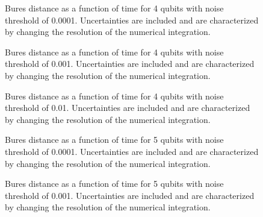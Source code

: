 \pagebreak

\begin{figure}[h]
\begin{center}
\end{center}
\caption{Bures distance as a function of time for 4 qubits with noise
threshold of 0.0001.  Uncertainties are included and are characterized 
by changing the resolution of the numerical integration.}
\end{figure}

\pagebreak

\begin{figure}[h]
\begin{center}
\end{center}
\caption{Bures distance as a function of time for 4 qubits with noise
threshold of 0.001.  Uncertainties are included and are characterized 
by changing the resolution of the numerical integration.}
\end{figure}

\pagebreak

\begin{figure}[h]
\begin{center}
\end{center}
\caption{Bures distance as a function of time for 4 qubits with noise
threshold of 0.01.  Uncertainties are included and are characterized 
by changing the resolution of the numerical integration.}
\end{figure}

\pagebreak

\begin{figure}[h]
\begin{center}
\end{center}
\caption{Bures distance as a function of time for 5 qubits with noise
threshold of 0.0001.  Uncertainties are included and are characterized 
by changing the resolution of the numerical integration.}
\end{figure}

\pagebreak

\begin{figure}[h]
\begin{center}
\end{center}
\caption{Bures distance as a function of time for 5 qubits with noise
threshold of 0.001.  Uncertainties are included and are characterized 
by changing the resolution of the numerical integration.}
\end{figure}

